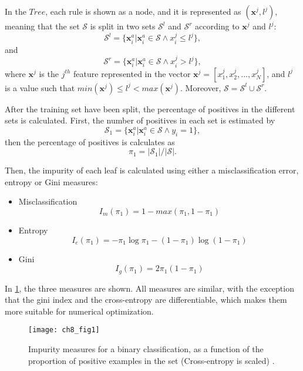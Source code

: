In the $Tree$, each rule is shown as a node, and it is represented as $(\mathbf{x}^j,l^j)$, meaning 
that the 
set $\mathcal{S}$ is split in two sets $\mathcal{S}^l$ and $\mathcal{S}^r$ according to 
$\mathbf{x}^j$ and $l^j$:
\begin{equation}
  \mathcal{S}^l = \{\mathbf{x}^a_i \vert \mathbf{x}^a_i \in \mathcal{S} \wedge x^j_i \le l^j \},
\end{equation}
and
\begin{equation}
  \mathcal{S}^r = \{\mathbf{x}^a_i \vert \mathbf{x}^a_i \in \mathcal{S} \wedge x^j_i > l^j \},
\end{equation}
where $\mathbf{x}^j$ is the $j^{th}$ feature represented in the vector 
$\mathbf{x}^j=[x_1^j,x_2^j,...,x_N^j]$, and $l^j$ is a value such that $min(\mathbf{x}^j) \le l^j < 
max(\mathbf{x}^j)$. Moreover, $\mathcal{S} = \mathcal{S}^l \cup \mathcal{S}^r$.

After the training set have been split, the percentage of positives in the different sets is 
calculated. First, the number of positives in each set is estimated by
\begin{equation}
 \mathcal{S}_1 = \{\mathbf{x}^a_i \vert \mathbf{x}_i^a \in \mathcal{S} \wedge y_i =1 \},
\end{equation}
then the percentage of positives is calculates as
\begin{equation}
 \pi_1=\vert \mathcal{S}_1 \vert / \vert \mathcal{S} \vert.
\end{equation}

Then, the impurity of each leaf is calculated using either a misclassification error, 
entropy or Gini measures:
\begin{itemize}
 \item  Misclassification
 \begin{equation}
 I_m(\pi_1)=1-max(\pi_1,1-\pi_1)
 \end{equation}
 
 \item Entropy
 \begin{equation}
 I_e(\pi_1)=-\pi_1\log \pi_1 -(1-\pi_1) \log (1-\pi_1)
 \end{equation}
 
 \item Gini
 \begin{equation}
 I_g(\pi_1)=2\pi_1(1-\pi_1)
 \end{equation}
\end{itemize}

In \figurename{ \ref{fig:8:impurity}}, the three measures are shown. All measures are similar, with 
the exception that the gini index and the cross-entropy are differentiable, which makes them
more suitable for numerical optimization.
\begin{figure}[t!]
\texttt{[image: ch8\_fig1]}
\caption{Impurity measures for a binary classification, as a function of the proportion of
positive examples in the set (Cross-entropy is scaled) \citep{Hastie2009}.}
\label{fig:8:impurity}
\end{figure} 

